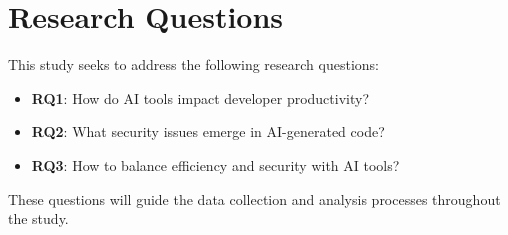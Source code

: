 \section{Research Questions}
This study seeks to address the following research questions:

\begin{itemize}
    \item \textbf{RQ1}: How do AI tools impact developer productivity?
    \item \textbf{RQ2}: What security issues emerge in AI-generated code?
    \item \textbf{RQ3}: How to balance efficiency and security with AI tools?
\end{itemize}


These questions will guide the data collection and analysis processes throughout the study.
